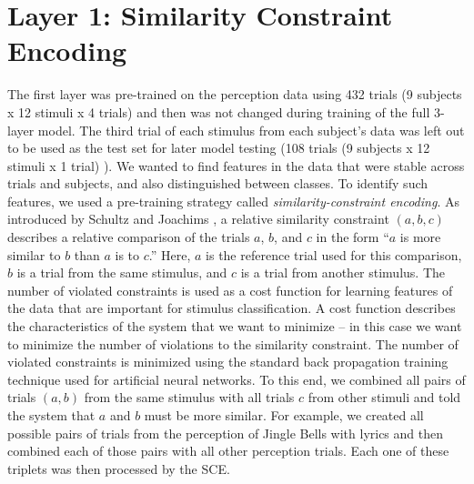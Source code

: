 \section{Layer 1: Similarity Constraint Encoding}
The first layer was pre-trained on the perception data using 432 trials (9 subjects x 12 stimuli x 4 trials) and then was not changed during training of the full 3-layer model. 
The third trial of each stimulus from each subject's data was left out to be used as the test set for later model testing (108 trials (9 subjects x 12 stimuli x 1 trial) ).
We wanted to find features in the data that were stable across trials and subjects, and also distinguished between classes. 
To identify such features, we used a pre-training strategy called \emph{similarity-constraint encoding}.
As introduced by Schultz and Joachims \citeyear{schultz_learning_2004}, a relative similarity constraint $(a,b,c)$ describes a relative comparison of the trials $a$, $b$, and $c$ in the form ``$a$ is more similar to $b$ than $a$ is to $c$.''
Here, $a$ is the reference trial used for this comparison, $b$ is a trial from the same stimulus, and $c$ is a trial from another stimulus.
The number of violated constraints is used as a cost function for learning features of the data that are important for stimulus classification. 
A cost function describes the characteristics of the system that we want to minimize -- in this case we want to minimize the number of violations to the similarity constraint.
The number of violated constraints is minimized using the standard back propagation training technique used for artificial neural networks.
To this end, we combined all pairs of trials $(a,b)$ from the same stimulus with all trials $c$ from other stimuli and told the system that $a$ and $b$ must be more similar.
For example, we created all possible pairs of trials from the perception of Jingle Bells with lyrics and then combined each of those pairs with all other perception trials.
Each one of these triplets was then processed by the \ac{SCE}. %
